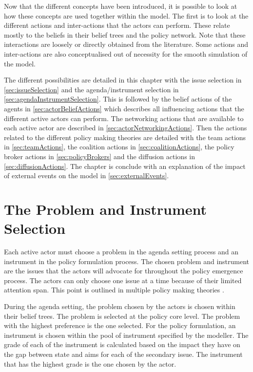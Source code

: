Now that the different concepts have been introduced, it is possible to look at how these concepts are used together within the model. The first is to look at the different actions and inter-actions that the actors can perform. These relate mostly to the beliefs in their belief trees and the policy network. Note that these interactions are loosely or directly obtained from the literature. Some actions and inter-actions are also conceptualised out of necessity for the smooth simulation of the model.

The different possibilities are detailed in this chapter with the issue selection in \autoref{sec:issueSelection} and the agenda/instrument selection in \autoref{sec:agendaInstrumentSelection}. This is followed by the belief actions of the agents in \autoref{sec:actorBeliefActions} which describes all influencing actions that the different active actors can perform. The networking actions that are available to each active actor are described in \autoref{sec:actorNetworkingActions}. Then the actions related to the different policy making theories are detailed with the team actions in \autoref{sec:teamActions}, the coalition actions in \autoref{sec:coalitionActions}, the policy broker actions in \autoref{sec:policyBrokers} and the diffusion actions in \autoref{sec:diffusionActions}. The chapter is conclude with an explanation of the impact of external events on the model in \autoref{sec:externalEvents}.

%
\section{The Problem and Instrument Selection}
\label{sec:issueSelection}

Each active actor must choose a problem in the agenda setting process and an instrument in the policy formulation process. The chosen problem and instrument are the issues that the actors will advocate for throughout the policy emergence process. The actors can only choose one issue at a time because of their limited attention span. This point is outlined in multiple policy making theories \citep{zahariadis2007multiple, baumgartner2014punctuated, jenkins2014advocacy}.

During the agenda setting, the problem chosen by the actors is chosen within their belief trees. The problem is selected at the policy core level. The problem with the highest preference is the one selected. For the policy formulation, an instrument is chosen within the pool of instrument specified by the modeller. The grade of each of the instrument is calculated based on the impact they have on the gap between state and aims for each of the secondary issue. The instrument that has the highest grade is the one chosen by the actor.

